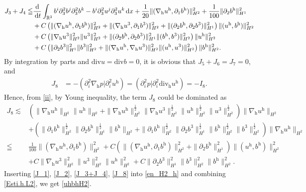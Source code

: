 \documentclass[11pt]{amsart}
\theoremstyle{definition}
\newcommand{\R}{\mathbb{R}}
\newcommand{\h}{\mathrm{h}}
\newcommand{\dx}{\,{\rm d}x}
\newcommand{\dt}{\,{\rm d}t}
\newcommand{\nablah}{\nabla_{\mathrm{h}}}
\numberwithin{equation}{section}
\begin{document}
\begin{align}\label{J_3+J_4}
	J_3+J_4\leqq&\frac{\mathrm{d}}{\dt}\int_{\R^3} b^i\partial_3^2b^j\partial_3^2b^k-b^i\partial_3^2u^j\partial_3^2u^k\dx+\frac{1}{20}\|(\nablah u^\h,\partial_1b^\h)\|_{H^2}^2+\frac{1}{100}\|\partial_2b^\h\|_{H^1}^2\nonumber\\
	&+C\left(\|(\nablah u^\h,\partial_1b^\h)\|_{H^2}^2+\|(\nablah u^3,\partial_1b^3)\|_{H^2}^2+\|(\partial_2b^\h,\partial_2b^3)\|_{H^1}^2\right)\|(u^\h,b^\h)\|_{H^2}^2\nonumber\\
	&+C\left(\|\nablah u^3\|_{H^2}^2\|u^3\|_{H^2}^2+ \|(\partial_2b^\h,\partial_2b^3)\|_{H^1}^2\|(b^\h,b^3)\|_{H^2}^2\right)\|u^\h\|_{H^2}^2\nonumber\\	&+C\left(\|\partial_2b^3\|_{H^1}^2\|b^3\|_{H^2}^2+\|(\nablah u^\h,\nablah u^3)\|_{H^2}^2\|(u^\h,u^3)\|_{H^2}^2\right)\|b^\h\|_{H^2}^2.
\end{align}
By integration by parts and $\mathrm{div}u=\mathrm{div}b=0$, it is obvious that $J_{5}+J_{6}=J_{7}=0$, and
\begin{align*}
	J_{8}&=-\left(\partial_i^2\nabla_\mathrm{h}p| \partial_i^2u^\mathrm{h}\right) =\left( \partial_i^2p| \partial_i^2\mathrm{div_h}u^\mathrm{h}\right)=-I_8.
\end{align*}
Hence, from \eqref{ii}, by Young inequality, the term $J_8$ could be dominated as
\begin{align}\label{J_8}
	J_8\lesssim&\left(\|\nablah u^\h\|_{H^2}\|u^\h\|_{H^2}+ \|\nablah u^\h\|_{H^2}^\frac12\|\nablah u^3\|_{H^2}^\frac12\|u^\h\|_{H^2}^\frac12\|u^3\|_{H^2}^\frac12 \right)\|\nablah u^\h\|_{H^{2}}\nonumber\\
	&+\left(\|\partial_1b^\h\|_{H^2}^\frac12\|\partial_2b^\h\|_{H^1}^\frac12\|b^\h\|_{H^2}+\|\partial_1b^\h\|_{H^2}^\frac12\|\partial_2b^3\|_{H^1}^\frac12\|b^\h\|_{H^2}^\frac12\|b^3\|_{H^2}^\frac12\right)\|\nablah u^\h\|_{H^{2}}\nonumber\\
	\leqq&\frac{1}{100}\|(\nablah u^\h,\partial_1b^\h)\|_{H^2}^2+C\left(\|(\nablah u^\h,\partial_1b^\h)\|_{H^2}^2+\|\partial_2b^\h\|_{H^1}^2\right)\|(u^\h,b^\h)\|_{H^2}^2\nonumber\\
	&+C\|\nablah u^3\|_{H^2}^2\|u^3\|_{H^2}^2\|u^\h\|_{H^2}^2+C\|\partial_2b^3\|_{H^1}^2\|b^3\|_{H^2}^2\|b^\h\|_{H^2}^2.
\end{align}
Inserting \eqref{J_1}, \eqref{J_2}, \eqref{J_3+J_4}, \eqref{J_8} into \eqref{en_H2_h} and combining \eqref{Esti.h.L2}, we get \eqref{uhbhH2}.
\end{document}
